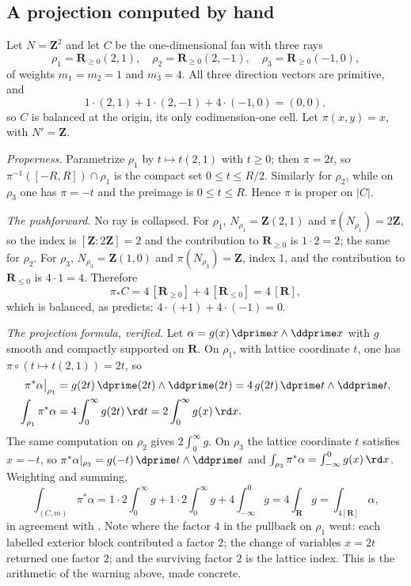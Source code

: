 \subsection{A projection computed by hand}
\label{sec:ch11-projection-example}

\begin{example}
\label{ex:ch11-projection-curve}
Let $N=\mathbf Z^2$ and let $C$ be the one-dimensional fan with three rays
\[
 \rho_1=\mathbf R_{\ge0}(2,1),\quad
 \rho_2=\mathbf R_{\ge0}(2,-1),\quad
 \rho_3=\mathbf R_{\ge0}(-1,0),
\]
of weights $m_1=m_2=1$ and $m_3=4$.  All three direction vectors are
primitive, and
\[
 1\cdot(2,1)+1\cdot(2,-1)+4\cdot(-1,0)=(0,0),
\]
so $C$ is balanced at the origin, its only codimension-one cell.  Let
$\pi(x,y)=x$, with $N'=\mathbf Z$.

\emph{Properness.}  Parametrize $\rho_1$ by $t\mapsto t(2,1)$ with $t\ge0$;
then $\pi=2t$, so $\pi^{-1}([-R,R])\cap\rho_1$ is the compact set
$0\le t\le R/2$.  Similarly for $\rho_2$, while on $\rho_3$ one has
$\pi=-t$ and the preimage is $0\le t\le R$.  Hence $\pi$ is proper on $|C|$.

\emph{The pushforward.}  No ray is collapsed.  For $\rho_1$,
$N_{\rho_1}=\mathbf Z(2,1)$ and $\pi(N_{\rho_1})=2\mathbf Z$, so the index is
$[\mathbf Z:2\mathbf Z]=2$ and the contribution to $\mathbf R_{\ge0}$ is
$1\cdot2=2$; the same for $\rho_2$.  For $\rho_3$,
$N_{\rho_3}=\mathbf Z(1,0)$ and $\pi(N_{\rho_3})=\mathbf Z$, index $1$, and
the contribution to $\mathbf R_{\le0}$ is $4\cdot1=4$.  Therefore
\[
 \pi_*C=4\,[\mathbf R_{\ge0}]+4\,[\mathbf R_{\le0}]=4\,[\mathbf R],
\]
which is balanced, as  predicts:
$4\cdot(+1)+4\cdot(-1)=0$.

\emph{The projection formula, verified.}  Let
$\alpha=g(x)\,\dprime x\wedge\ddprime x$ with $g$ smooth and compactly
supported on $\mathbf R$.  On $\rho_1$, with lattice coordinate $t$, one has
$\pi\circ(t\mapsto t(2,1))=2t$, so
 \[
  \begin{aligned}
  \pi^*\alpha\big|_{\rho_1}
    &=g(2t)\,\dprime(2t)\wedge\ddprime(2t)
      =4\,g(2t)\,\dprime t\wedge\ddprime t,\\
  \int_{\rho_1}\pi^*\alpha
    &=4\int_0^\infty g(2t)\,\rd t
      =2\int_0^\infty g(x)\,\rd x .
  \end{aligned}
 \]
The same computation on $\rho_2$ gives $2\int_0^\infty g$.  On $\rho_3$ the
lattice coordinate $t$ satisfies $x=-t$, so
$\pi^*\alpha|_{\rho_3}=g(-t)\,\dprime t\wedge\ddprime t$ and
$\int_{\rho_3}\pi^*\alpha=\int_{-\infty}^0g(x)\,\rd x$.  Weighting and
summing,
\[
 \int_{(C,m)}\pi^*\alpha
 =1\cdot2\!\int_0^\infty\! g+1\cdot2\!\int_0^\infty\! g
   +4\!\int_{-\infty}^0\! g
 =4\int_{\mathbf R}g
 =\int_{4[\mathbf R]}\alpha ,
\]
in agreement with .  Note where the
factor $4$ in the pullback on $\rho_1$ went: each labelled exterior block
contributed a factor $2$; the change of
variables $x=2t$ returned one factor $2$; and the surviving factor $2$ is
the lattice index.  This is the arithmetic of the warning above, made
concrete.


\end{example}
